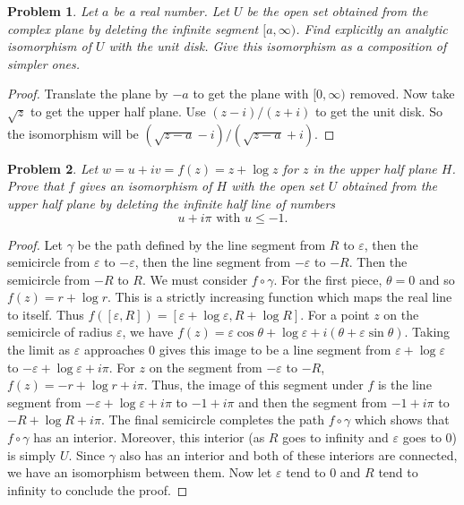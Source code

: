 \documentclass{article}
\newtheorem{problem}{Problem}
\begin{document}
\begin{problem}
Let $a$ be a real number. Let $U$ be the open set obtained from the complex plane by deleting the infinite segment $[a, \infty)$. Find explicitly an analytic isomorphism of $U$ with the unit disk. Give this isomorphism as a composition of simpler ones.
\end{problem}
\begin{proof}
Translate the plane by $-a$ to get the plane with $[0, \infty)$ removed. Now take $\sqrt{z}$ to get the upper half plane. Use $(z-i)/(z+i)$ to get the unit disk. So the isomorphism will be $(\sqrt{z-a}-i)/(\sqrt{z-a}+i)$.
\end{proof}

\begin{problem}
Let $w = u + iv = f(z) = z + \log z$ for $z$ in the upper half plane $H$. Prove that $f$ gives an isomorphism of $H$ with the open set $U$ obtained from the upper half plane by deleting the infinite half line of numbers
\[
\text{$u + i \pi$ with $u \leq -1$}.
\]
\end{problem}
\begin{proof}
Let $\gamma$ be the path defined by the line segment from $R$ to $\varepsilon$, then the semicircle from $\varepsilon$ to $-\varepsilon$, then the line segment from $-\varepsilon$ to $-R$. Then the semicircle from $-R$ to $R$. We must consider $f \circ \gamma$. For the first piece, $\theta = 0$ and so $f(z) = r + \log r$. This is a strictly increasing function which maps the real line to itself. Thus $f([\varepsilon, R]) = [\varepsilon + \log \varepsilon, R + \log R]$. For a point $z$ on the semicircle of radius $\varepsilon$, we have $f(z) = \varepsilon \cos \theta + \log \varepsilon + i(\theta + \varepsilon \sin \theta)$. Taking the limit as $\varepsilon$ approaches $0$ gives this image to be a line segment from $\varepsilon + \log \varepsilon$ to $-\varepsilon + \log \varepsilon + i \pi$. For $z$ on the segment from $-\varepsilon$ to $-R$, $f(z) = -r + \log r + i \pi$. Thus, the image of this segment under $f$ is the line segment from $-\varepsilon + \log \varepsilon + i \pi$ to $-1 + i \pi$ and then the segment from $-1 + i \pi$ to $-R + \log R + i \pi$. The final semicircle completes the path $f \circ \gamma$ which shows that $f \circ \gamma$ has an interior. Moreover, this interior (as $R$ goes to infinity and $\varepsilon$ goes to $0$) is simply $U$. Since $\gamma$ also has an interior and both of these interiors are connected, we have an isomorphism between them. Now let $\varepsilon$ tend to $0$ and $R$ tend to infinity to conclude the proof.
\end{proof}
\end{document}
